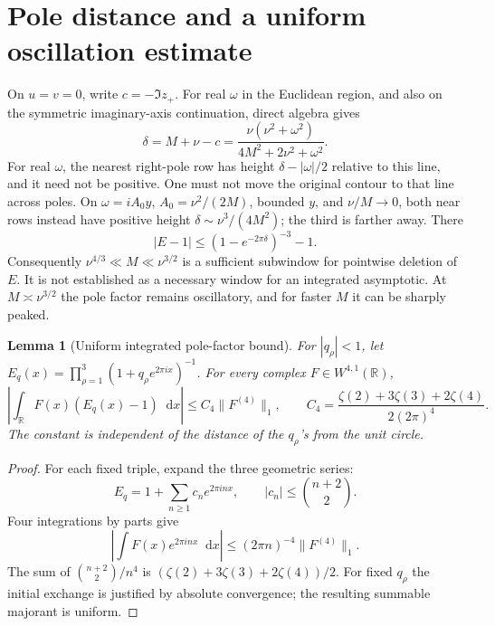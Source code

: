\documentclass[11pt,a4paper]{article}
\newtheorem{lemma}{Lemma}
\newcommand{\dd}{\mathop{}\!\mathrm d}
\begin{document}
\section{Pole distance and a uniform oscillation estimate}
On \(u=v=0\), write \(c=-\Im z_+\). For real \(\omega\) in the
Euclidean region, and also on the symmetric imaginary-axis
continuation, direct algebra gives
\begin{equation}
 \delta=M+\nu-c=
 \frac{\nu(\nu^2+\omega^2)}{4M^2+2\nu^2+\omega^2}.
 \label{eq:height}
\end{equation}
For real \(\omega\), the nearest right-pole row has height
\(\delta-|\omega|/2\) relative to this line, and it need not be positive.
One must not move the original contour to that line across poles.
On \(\omega=iA_0y\), \(A_0=\nu^2/(2M)\), bounded \(y\), and
\(\nu/M\to0\), both near rows instead have positive height
\(\delta\sim\nu^3/(4M^2)\); the third is farther away.
There
\begin{equation}
 |E-1|\le (1-e^{-2\pi\delta})^{-3}-1.
\end{equation}
Consequently \(\nu^{4/3}\ll M\ll\nu^{3/2}\) is a sufficient
subwindow for pointwise deletion of \(E\). It is not established
as a necessary window for an integrated asymptotic.
At \(M\asymp\nu^{3/2}\) the pole factor remains oscillatory, and
for faster \(M\) it can be sharply peaked.

\begin{lemma}[Uniform integrated pole-factor bound]
For \(|q_\rho|<1\), let
\(E_q(x)=\prod_{\rho=1}^3(1+q_\rho e^{2\pi ix})^{-1}\).
For every complex \(F\in W^{4,1}(\mathbb R)\),
\begin{equation}
 \left|\int_{\mathbb R} F(x)(E_q(x)-1)\dd x\right|
 \le C_4\|F^{(4)}\|_1,\qquad
 C_4=\frac{\zeta(2)+3\zeta(3)+2\zeta(4)}{2(2\pi)^4}.
 \label{eq:fourier}
\end{equation}
The constant is independent of the distance of the \(q_\rho\)'s
from the unit circle.
\end{lemma}
\begin{proof}
For each fixed triple, expand the three geometric series:
\[
 E_q=1+\sum_{n\ge1}c_ne^{2\pi inx},\qquad
 |c_n|\le\binom{n+2}{2}.
\]
Four integrations by parts give
\[
 \left|\int F(x)e^{2\pi inx}\dd x\right|
 \le (2\pi n)^{-4}\|F^{(4)}\|_1 .
\]
The sum of \(\binom{n+2}{2}/n^4\) is
\((\zeta(2)+3\zeta(3)+2\zeta(4))/2\).
For fixed \(q_\rho\) the initial exchange is justified by absolute
convergence; the resulting summable majorant is uniform.
\end{proof}
\end{document}
